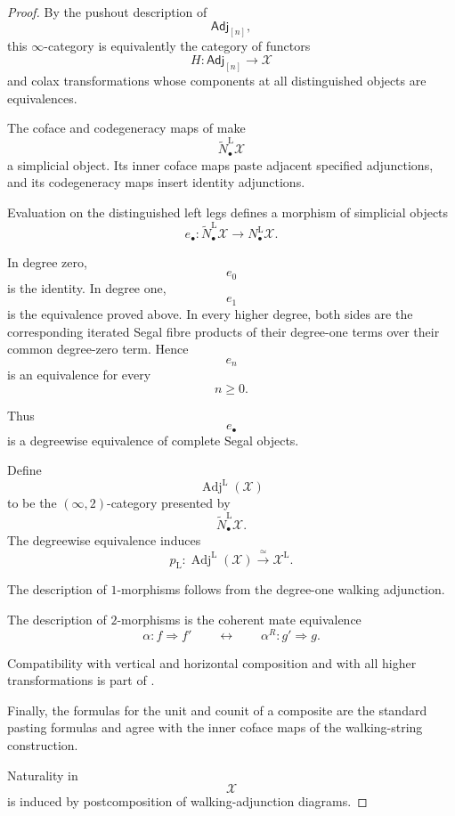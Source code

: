 \begin{proof}
By the pushout description of
\[
    \mathsf{Adj}_{[n]},
\]
this $\infty$-category is equivalently the category of functors
\[
    H
    \colon
    \mathsf{Adj}_{[n]}
    \longrightarrow
    \mathcal X
\]
and colax transformations whose components at all distinguished objects
are equivalences.

The coface and codegeneracy maps of
make
\[
    \widetilde N_\bullet^{\mathrm L}\mathcal X
\]
a simplicial object. Its inner coface maps paste adjacent specified
adjunctions, and its codegeneracy maps insert identity adjunctions.

Evaluation on the distinguished left legs defines a morphism of
simplicial objects
\[
    e_\bullet
    \colon
    \widetilde N_\bullet^{\mathrm L}\mathcal X
    \longrightarrow
    N_\bullet^{\mathrm L}\mathcal X.
\]

In degree zero,
\[
    e_0
\]
is the identity. In degree one,
\[
    e_1
\]
is the equivalence proved above. In every higher degree, both sides are
the corresponding iterated Segal fibre products of their degree-one
terms over their common degree-zero term. Hence
\[
    e_n
\]
is an equivalence for every
\[
    n\geq 0.
\]

Thus
\[
    e_\bullet
\]
is a degreewise equivalence of complete Segal objects.

Define
\[
    \operatorname{Adj}^{\mathrm L}(\mathcal X)
\]
to be the $(\infty,2)$-category presented by
\[
    \widetilde N_\bullet^{\mathrm L}\mathcal X.
\]
The degreewise equivalence induces
\[
    p_{\mathrm L}
    \colon
    \operatorname{Adj}^{\mathrm L}(\mathcal X)
    \xrightarrow{\;\simeq\;}
    \mathcal X^{\mathrm L}.
\]

The description of $1$-morphisms follows from the degree-one walking
adjunction.

The description of $2$-morphisms is the coherent mate equivalence
\[
    \alpha
    \colon
    f
    \Longrightarrow
    f'
    \qquad\longleftrightarrow\qquad
    \alpha^R
    \colon
    g'
    \Longrightarrow
    g.
\]

Compatibility with vertical and horizontal composition and with all
higher transformations is part of
\cite[Theorem~5.3.6]{AbellanGagnaHaugsengMates}.

Finally, the formulas for the unit and counit of a composite are the
standard pasting formulas and agree with the inner coface maps of the
walking-string construction.

Naturality in
\[
    \mathcal X
\]
is induced by postcomposition of walking-adjunction diagrams.
\end{proof}

